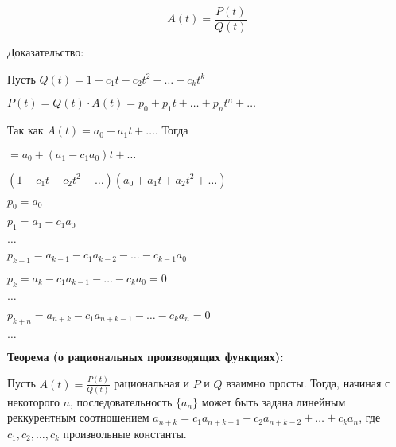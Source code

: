     \[
        A(t) = \frac{P(t)}{Q(t)}  
    \]
    \bigskip

    Доказательство:
    \bigskip

    Пусть $Q(t) = 1 - c_1t - c_2t^2 - \dots - c_kt^k$
    \smallskip

    $P(t) = Q(t) \cdot A(t) = p_0 + p_1t + \dots + p_nt^n + \dots$
    \smallskip

    Так как $A(t) = a_0 + a_1 t + \dots$. Тогда
    \smallskip

    $= a_0 + (a_1 - c_1a_0)t + \dots$
    \smallskip

    $(1 - c_1 t - c_2 t^2 - \dots)(a_0 + a_1 t + a_2 t^2 + \dots)$
    \smallskip

    $p_0 = a_0$
    \smallskip

    $p_1 = a_1 - c_1 a_0$
    \smallskip

    $\dots$
    \smallskip

    $p_{k - 1} = a_{k - 1} - c_1 a_{k - 2} - \dots - c_{k - 1}a_0$
    \smallskip

    $p_k = a_k - c_1 a_{k - 1} - \dots - c_k a_0 = 0$
    \smallskip

    $\dots$
    \smallskip

    $p_{k + n} = a_{n + k} - c_1 a_{n + k - 1} - \dots - c_k a_n = 0$
    \smallskip

    $\dots$
    \bigskip

\textbf{Теорема (о рациональных производящих функциях):}
    \smallskip
    
    Пусть $A(t) = \frac{P(t)}{Q(t)}$ рациональная и $P$ и $Q$ взаимно просты.
    Тогда, начиная с некоторого $n$, последовательность $\{a_n\}$ может
    быть задана линейным реккурентным соотношением $a_{n + k} =
    c_1 a_{n + k - 1} + c_2 a_{n + k - 2} + \dots + c_k a_n$,
    где $c_1, c_2, \dots, c_k$ произвольные константы.

